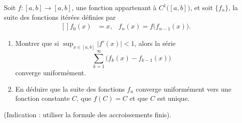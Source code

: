 \begin{exercice}\label{exo_I-1-15}

Soit $f\colon [a,b]\to [a,b]$, une fonction appartenant à $C^1\big( [a,b] \big)$, et soit $\{ f_n \}$, la suite des fonctions itérées définies par
\begin{equation}
	\begin{aligned}[]
	f_0(x)&=x,		&	f_n(x)=f\big( f_{n-1}(x) \big).
	\end{aligned}
\end{equation}
\begin{enumerate}
\item Montrer que si $\sup_{x\in [a,b]}| f'(x) |<1$, alors la série
\begin{equation}
	\sum_{k=1}^{\infty}\big( f_k(x)-f_{k-1}(x) \big)
\end{equation}
converge uniformément.
\item En déduire que la suite des fonctions $ f_n$ converge uniformément vers une fonction constante $C$, que $f(C)=C$ et que $C$ est unique.
\end{enumerate}
(Indication : utiliser la formule des accroissements finis).

\end{exercice}


